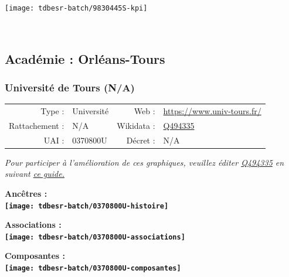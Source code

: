 \documentclass[12pt,french,]{article}
\begin{document}
\begin{center}\texttt{[image: tdbesr-batch/9830445S-kpi]} \end{center}\checkoddpage

\ifoddpage \fi ~\newpage  

\hypertarget{acaduxe9mie-orluxe9ans-tours}{%
\subsection{Académie :
Orléans-Tours}\label{acaduxe9mie-orluxe9ans-tours}}

\hypertarget{universituxe9-de-tours-na}{%
\subsubsection{Université de Tours
(N/A)}\label{universituxe9-de-tours-na}}

\begin{tabular*}{\textwidth}{rp{5cm}rl}  
\hline  
Type : & Université & Web : &\href{https://www.univ-tours.fr/}{https://www.univ-tours.fr/} \\  
Rattachement : & N/A & Wikidata : & \href{https://www.wikidata.org/entity/Q494335}{Q494335} \\  
UAI : & 0370800U & Décret : & N/A \\  
\hline  
\end{tabular*}

\textit{\scriptsize Pour participer à l'amélioration de ces graphiques, veuillez éditer  \href{https://www.wikidata.org/entity/Q494335}{Q494335}  en suivant \href{https://github.com/cpesr/wikidataESR/blob/master/Rmd/wikidataESR.md}{ce guide.}}

\vspace{1cm}  
\begin{minipage}[b]{0.50\textwidth}\begin{center} \bf Ancêtres : \\  
\texttt{[image: tdbesr-batch/0370800U-histoire]} \end{center}\end{minipage}\begin{minipage}[b]{0.50\textwidth}\begin{center} \bf Associations : \\  
\texttt{[image: tdbesr-batch/0370800U-associations]} \end{center}\end{minipage}

\hrulefill

\begin{center} \bf Composantes : \\  
\texttt{[image: tdbesr-batch/0370800U-composantes]} \end{center}
\end{document}

